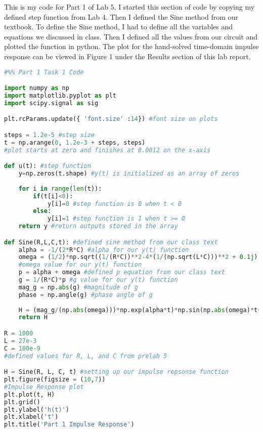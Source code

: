 \documentclass[12pt]{report}
\begin{document}
This is my code for Part 1 of Lab 5. I started this section of code by copying my defined step function from Lab 4. Then I defined the Sine method from our textbook. To define the Sine method, I had to define all the variables and equations we discussed in class. Then I defined all the values from our circuit and plotted the function in python. The plot for the hand-solved time-domain impulse response can be viewed in Figure 1 under the Results section of this lab report.  
\begin{lstlisting}[language=Python]
#%% Part 1 Task 1 Code

import numpy as np
import matplotlib.pyplot as plt
import scipy.signal as sig

plt.rcParams.update({ 'font.size' :14}) #font size on plots

steps = 1.2e-5 #step size
t = np.arange(0, 1.2e-3 + steps, steps) 
#plot starts at zero and finishes at 0.0012 on the x-axis

def u(t): #step function
    y=np.zeros(t.shape) #y(t) is initialized as an array of zeros
    
    for i in range(len(t)):
        if(t[i]<0):
            y[i]=0 #step function is 0 when t < 0
        else:
            y[i]=1 #step function is 1 when t >= 0
    return y #return outputs stored in the array

def Sine(R,L,C,t): #defined sine method from our class text
    alpha = -1/(2*R*C) #alpha for our y(t) function
    omega = (1/2)*np.sqrt((1/(R*C))**2-4*(1/(np.sqrt(L*C)))**2 + 0.1j)
    #omega value for our y(t) function
    p = alpha + omega #defined p equation from our class text
    g = 1/(R*C)*p #g value for our y(t) function
    mag_g = np.abs(g) #magnitude of g
    phase = np.angle(g) #phase angle of g
    
    H = (mag_g/(np.abs(omega)))*np.exp(alpha*t)*np.sin(np.abs(omega)*t+phase)*u(t)
    return H

R = 1000
L = 27e-3
C = 100e-9
#defined values for R, L, and C from prelab 5

H = Sine(R, L, C, t) #setting up our impulse repsonse function
plt.figure(figsize = (10,7))
#Impulse Response plot
plt.plot(t, H)
plt.grid()
plt.ylabel('h(t)')
plt.xlabel('t')
plt.title('Part 1 Impulse Response')
\end{lstlisting}
\end{document}
